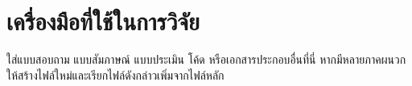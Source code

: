\chapter{เครื่องมือที่ใช้ในการวิจัย}
ใส่แบบสอบถาม แบบสัมภาษณ์ แบบประเมิน โค้ด หรือเอกสารประกอบอื่นที่นี่
หากมีหลายภาคผนวก ให้สร้างไฟล์ใหม่และเรียกไฟล์ดังกล่าวเพิ่มจากไฟล์หลัก
